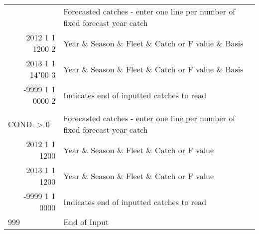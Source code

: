 \begin{landscape}
\begin{longtable}{p{3.2cm} p{7cm} p{10.8cm}}
  \pagebreak
  \multicolumn{1}{l}{COND: == -1 }& \multicolumn{2}{l}{Forecasted catches - enter one line per number of fixed forecast year catch }\\
  \multicolumn{1}{r}{2012 1 1 1200 2}  & \multicolumn{2}{l}{Year \& Season \& Fleet \& Catch or F value \& Basis}  \\
  \multicolumn{1}{r}{2013 1 1 14"00 3}  & \multicolumn{2}{l}{Year \& Season \& Fleet \& Catch or F value \& Basis}  \\
  \multicolumn{1}{r}{-9999 1 1 0000 2}  & \multicolumn{2}{l}{Indicates end of inputted catches to read}  \\
  \\
  \multicolumn{1}{l}{COND: > 0 }& \multicolumn{2}{l}{Forecasted catches - enter one line per number of fixed forecast year catch }\\
  \multicolumn{1}{r}{2012  1 1 1200}  & \multicolumn{2}{l}{Year \& Season \& Fleet \& Catch or F value}  \\
  \multicolumn{1}{r}{2013  1 1 1200}  & \multicolumn{2}{l}{Year \& Season \& Fleet \& Catch or F value}  \\
  \multicolumn{1}{r}{-9999 1 1 0000}  & \multicolumn{2}{l}{Indicates end of inputted catches to read}  \\
  
  \hline
  999 & End of Input & \\

  \end{longtable}
\end{landscape}

\hypertarget{Benchmark}{}
